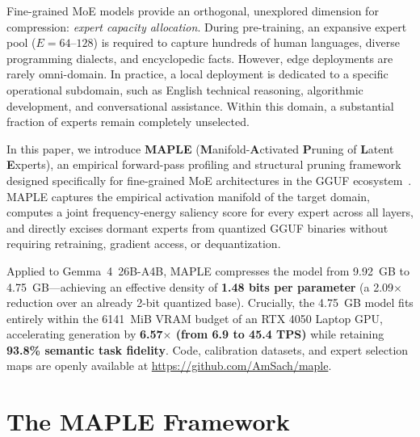 \documentclass[conference]{IEEEtran}
\newcommand{\MAPLE}{\textsc{MAPLE}}
\begin{document}
Fine-grained MoE models provide an orthogonal, unexplored dimension for compression: \emph{expert capacity allocation}. During pre-training, an expansive expert pool ($E = 64\text{--}128$) is required to capture hundreds of human languages, diverse programming dialects, and encyclopedic facts. However, edge deployments are rarely omni-domain. In practice, a local deployment is dedicated to a specific operational subdomain, such as English technical reasoning, algorithmic development, and conversational assistance. Within this domain, a substantial fraction of experts remain completely unselected.

In this paper, we introduce \textbf{\MAPLE{}} (\textbf{M}anifold-\textbf{A}ctivated \textbf{P}runing of \textbf{L}atent \textbf{E}xperts), an empirical forward-pass profiling and structural pruning framework designed specifically for fine-grained MoE architectures in the GGUF ecosystem~\cite{llama_cpp}. \MAPLE{} captures the empirical activation manifold of the target domain, computes a joint frequency-energy saliency score for every expert across all layers, and directly excises dormant experts from quantized GGUF binaries without requiring retraining, gradient access, or dequantization.

Applied to Gemma~4~26B-A4B, \MAPLE{} compresses the model from 9.92~GB to 4.75~GB---achieving an effective density of \textbf{1.48 bits per parameter} (a 2.09$\times$ reduction over an already 2-bit quantized base). Crucially, the 4.75~GB model fits entirely within the 6141~MiB VRAM budget of an RTX 4050 Laptop GPU, accelerating generation by \textbf{6.57$\times$ (from 6.9 to 45.4 TPS)} while retaining \textbf{93.8\% semantic task fidelity}. Code, calibration datasets, and expert selection maps are openly available at \url{https://github.com/AmSach/maple}.

\section{The MAPLE Framework}
\end{document}
